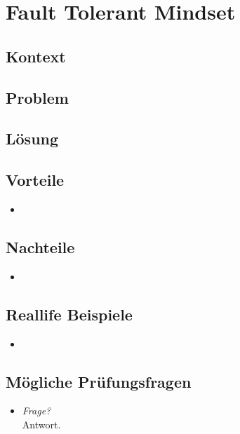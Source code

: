 \section{Fault Tolerant Mindset}

\subsection*{Kontext}


\subsection*{Problem}


\subsection*{Lösung}


\subsection*{Vorteile}
\begin{itemize}
	\item
\end{itemize}

\subsection*{Nachteile}
\begin{itemize}
	\item
\end{itemize}

\subsection*{Reallife Beispiele}
\begin{itemize}
	\item
\end{itemize}

\subsection*{Mögliche Prüfungsfragen}
\begin{itemize}
	\item \emph{Frage?}\\
	Antwort.
\end{itemize}